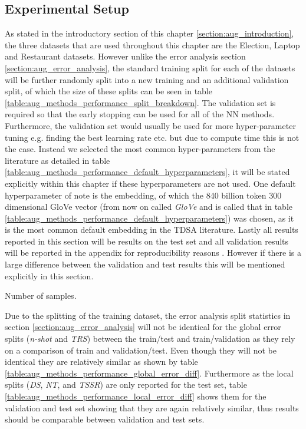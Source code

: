 \subsection{Experimental Setup}
\label{section:aug_experimental_setup}
As stated in the introductory section of this chapter \ref{section:aug_introduction}, the three datasets that are used throughout this chapter are the Election, Laptop and Restaurant datasets. However unlike the error analysis section \ref{section:aug_error_analysis}, the standard training split for each of the datasets will be further randomly split into a new training and an additional validation split, of which the size of these splits can be seen in table \ref{table:aug_methods_performance_split_breakdown}. The validation set is required so that the early stopping can be used for all of the NN methods. Furthermore, the validation set would usually be used for more hyper-parameter tuning e.g. finding the best learning rate etc. but due to compute time this is not the case. Instead we selected the most common hyper-parameters from the literature as detailed in table \ref{table:aug_methods_performance_default_hyperparameters}, it will be stated explicitly within this chapter if these hyperparameters are not used. One default hyperparameter of note is the embedding, of which the 840 billion token 300 dimensional GloVe vector \citep{vectors_pennington_2014} (from now on called \textit{GloVe} and is called that in table \ref{table:aug_methods_performance_default_hyperparameters}) was chosen, as it is the most common default embedding in the TDSA literature. Lastly all results reported in this section will be results on the test set and all validation results will be reported in the appendix for reproducibility reasons \citep{repro_Dodge2019ShowYW}. However if there is a large difference between the validation and test results this will be mentioned explicitly in this section.

\begin{table}[ht!]
    \centering
    
    \caption{Number of samples.}
    \label{table:aug_methods_performance_split_breakdown}
\end{table}

Due to the splitting of the training dataset, the error analysis split statistics in section \ref{section:aug_error_analysis} will not be identical for the global error splits (\textit{n-shot} and \textit{TRS}) between the train/test and train/validation as they rely on a comparison of train and validation/test. Even though they will not be identical they are relatively similar as shown by table \ref{table:aug_methods_performance_global_error_diff}. Furthermore as the local splits (\textit{DS}, \textit{NT}, and \textit{TSSR}) are only reported for the test set, table \ref{table:aug_methods_performance_local_error_diff} shows them for the validation and test set showing that they are again relatively similar, thus results should be comparable between validation and test sets.

